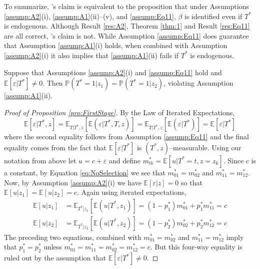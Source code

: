 To summarize, \citeauthor{Mahajan}'s claim is equivalent to the proposition that under Assumptions \ref{assump:A2}(i), \ref{assump:A1}(ii)--(v), and \ref{assump:Eq11}, $\beta$ is identified even if $T^*$ is endogenous.
Although Result \ref{res:A2}, Theorem \ref{thm:1} and Result \ref{res:Eq11} are all correct, \citeauthor{Mahajan}'s claim is not.
While Assumption \ref{assump:Eq11} does guarantee that Assumption \ref{assump:A1}(i) holds, when combined with Assumption \ref{assump:A2}(i) it also implies that \ref{assump:A1}(ii) fails if $T^*$ is endogenous.
\begin{pro}
  \label{pro:FirstStage}
  Suppose that Assumptions \ref{assump:A2}(i) and \ref{assump:Eq11} hold and $\mathbb{E}[\varepsilon|T^*]\neq0$. Then $\mathbb{P}(T^*=1|z_1) = \mathbb{P}(T^*=1|z_2)$, violating Assumption \ref{assump:A1}(ii). 
\end{pro}
\begin{proof}[Proof of Proposition \ref{pro:FirstStage}]
  By the Law of Iterated Expectations,
  \begin{equation}
    \label{eq:NoSelection}
    \mathbb{E}[\varepsilon|T^*,z] = \mathbb{E}_{T|T^*,z}\left[\mathbb{E}\left(\varepsilon|T^*,T,z \right)  \right] = \mathbb{E}_{T|T^*,z}\left[\mathbb{E}\left(\varepsilon|T^* \right)  \right]
    = \mathbb{E}\left[ \varepsilon|T^* \right]
  \end{equation}
    where the second equality follows from Assumption \ref{assump:Eq11} and the final equality comes from the fact that $\mathbb{E}[\varepsilon|T^*]$ is $(T^*,z)$--measurable. 
  Using our notation from above let $u = c + \varepsilon$ and define $m^*_{tk}=\mathbb{E}[u|T^*=t,z=z_k]$.
  Since $c$ is a constant, by Equation \ref{eq:NoSelection} we see that $m^*_{01}=m^*_{02}$ and $m^*_{11}=m^*_{12}$.
  Now, by Assumption \ref{assump:A2}(i) we have $\mathbb{E}[\varepsilon|z]=0$ so that $\mathbb{E}[u|z_1]= \mathbb{E}[u|z_2] =c$.
  Again using iterated expectations, 
  \begin{align*}
    \mathbb{E}\left[u|z_1 \right] &= \mathbb{E}_{T^*|z_1}\left[\mathbb{E}\left( u|T^*,z_1 \right)  \right] = (1-p_1^*) m^*_{01} + p^*_1 m^*_{11}=c\\
    \mathbb{E}\left[u|z_2 \right] &= \mathbb{E}_{T^*|z_2}\left[\mathbb{E}\left( u|T^*,z_2 \right)  \right] = (1-p_2^*) m^*_{02} + p^*_2 m^*_{12}=c
  \end{align*}
  The preceding two equations, combined with $m^*_{01}=m^*_{02}$ and $m^*_{11}=m^*_{12}$ imply that $p_1^* = p_2^*$ unless $m^*_{01} = m^*_{11} = m^*_{02} = m^*_{12} = c$.
  But this four-way equality is ruled out by the assumption that $\mathbb{E}[\varepsilon|T^*]\neq0$. 
\end{proof}

